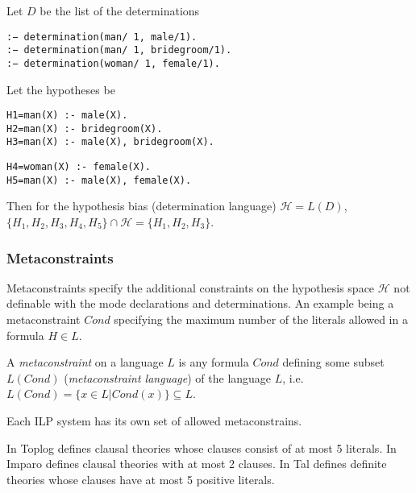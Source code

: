 \begin{exmp}
Let $D$ be the list of the determinations
\begin{lstlisting}
:− determination(man/ 1, male/1).
:− determination(man/ 1, bridegroom/1).
:− determination(woman/ 1, female/1).
\end{lstlisting}
Let the hypotheses be

\begin{minipage}[t]{.50\textwidth}
\begin{lstlisting}
H1=man(X) :- male(X).
H2=man(X) :- bridegroom(X).
H3=man(X) :- male(X), bridegroom(X).
\end{lstlisting}
\end{minipage}
\begin{minipage}[t]{.50\textwidth}
\begin{lstlisting}
H4=woman(X) :- female(X).
H5=man(X) :- male(X), female(X).
\end{lstlisting}
\end{minipage}

Then for the hypothesis bias (determination language) $\mathcal{H}=L(D)$,
$\{H_1, H_2, H_3, H_4, H_5\} \cap \mathcal{H}=\{H_1, H_2, H_3\}$.
\end{exmp}

\subsubsection{Metaconstraints}
Metaconstraints specify the additional constraints on the hypothesis space $\mathcal{H}$ not definable with the mode declarations and determinations.
An example being a metaconstraint $Cond$ specifying the maximum number of the literals allowed in a formula $H \in L$.

\begin{defn}
A \emph{metaconstraint} on a language $L$ is any formula $Cond$ defining some subset $L(Cond)$ (\emph{metaconstraint language}) of the language $L$, i.e. $L(Cond)=\{x \in L | Cond(x)\}\subseteq L$.
\end{defn}

Each ILP system has its own set of allowed metaconstrains.
\begin{exmp}
In Toplog  defines clausal theories whose clauses consist of at most 5 literals.
In Imparo  defines clausal theories with at most 2 clauses.
In Tal  defines definite theories whose clauses have at most 5 positive literals.
\end{exmp}

